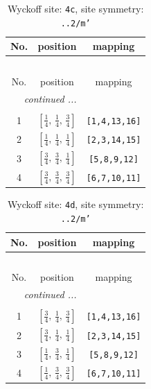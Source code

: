 \documentclass[fleqn,8pt]{jsarticle}
\begin{document}
\renewcommand{\arraystretch}{1.2}
\begin{longtable}{ccc}
\caption{Wyckoff site: {\tt 4c}, site symmetry: {\tt ..2/m'}}
 \\
 \hline \hline
No. & position & mapping \\ \hline \endfirsthead

\multicolumn{2}{l}{\tablename\ \thetable{}} \\
 \hline \hline
No. & position & mapping \\ \hline \endhead

 \hline \hline
\multicolumn{2}{r}{\footnotesize\it continued ...} \\ \endfoot

 \hline \hline
\multicolumn{2}{r}{} \\ \endlastfoot

1 & $\left[ \frac{1}{4},\, \frac{1}{4},\, \frac{3}{4} \right]$ & {\tt [1,4,13,16]} \\ \hline
2 & $\left[ \frac{1}{4},\, \frac{1}{4},\, \frac{1}{4} \right]$ & {\tt [2,3,14,15]} \\ \hline
3 & $\left[ \frac{3}{4},\, \frac{3}{4},\, \frac{1}{4} \right]$ & {\tt [5,8,9,12]} \\ \hline
4 & $\left[ \frac{3}{4},\, \frac{3}{4},\, \frac{3}{4} \right]$ & {\tt [6,7,10,11]} \\
\end{longtable}
\renewcommand{\arraystretch}{1.2}
\begin{longtable}{ccc}
\caption{Wyckoff site: {\tt 4d}, site symmetry: {\tt ..2/m'}}
 \\
 \hline \hline
No. & position & mapping \\ \hline \endfirsthead

\multicolumn{2}{l}{\tablename\ \thetable{}} \\
 \hline \hline
No. & position & mapping \\ \hline \endhead

 \hline \hline
\multicolumn{2}{r}{\footnotesize\it continued ...} \\ \endfoot

 \hline \hline
\multicolumn{2}{r}{} \\ \endlastfoot

1 & $\left[ \frac{3}{4},\, \frac{1}{4},\, \frac{3}{4} \right]$ & {\tt [1,4,13,16]} \\ \hline
2 & $\left[ \frac{3}{4},\, \frac{1}{4},\, \frac{1}{4} \right]$ & {\tt [2,3,14,15]} \\ \hline
3 & $\left[ \frac{1}{4},\, \frac{3}{4},\, \frac{1}{4} \right]$ & {\tt [5,8,9,12]} \\ \hline
4 & $\left[ \frac{1}{4},\, \frac{3}{4},\, \frac{3}{4} \right]$ & {\tt [6,7,10,11]} \\
\end{longtable}
\end{document}
